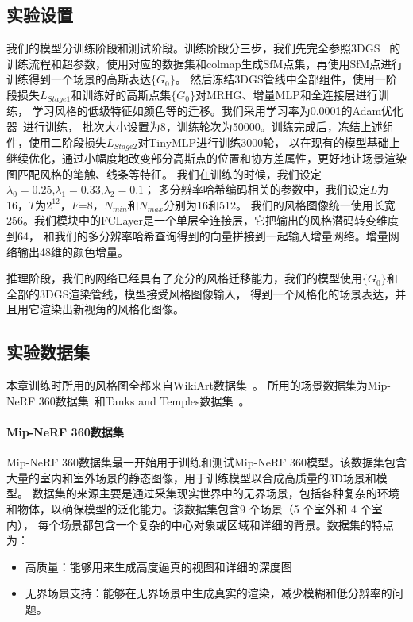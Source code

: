\subsection{实验设置}
我们的模型分训练阶段和测试阶段。训练阶段分三步，我们先完全参照3DGS~\cite{kerbl20233d}
的训练流程和超参数，使用对应的数据集和colmap生成SfM点集，再使用SfM点进行训练得到一个场景的高斯表达$\{G_0\}$。
然后冻结3DGS管线中全部组件，使用一阶段损失$L_{Stage1}$和训练好的高斯点集$\{G_0\}$对MRHG、增量MLP和全连接层进行训练，
学习风格的低级特征如颜色等的迁移。我们采用学习率为0.0001的Adam优化器~\cite{diederik2014adam}进行训练，
批次大小设置为8，训练轮次为50000。训练完成后，冻结上述组件，使用二阶段损失$L_{Stage2}$对TinyMLP进行训练3000轮，
以在现有的模型基础上继续优化，通过小幅度地改变部分高斯点的位置和协方差属性，更好地让场景渲染图匹配风格的笔触、线条等特征。
我们在训练的时候，我们设定\(\lambda_0=0.25\text{,}\lambda_1=0.33\text{,}\lambda_2=0.1\)；
多分辨率哈希编码相关的参数中，我们设定$L$为16，$T$为$2^{12}$，$F$=8，$N_{min}$和$N_{max}$分别为16和512。
我们的风格图像统一使用长宽256。我们模块中的FCLayer是一个单层全连接层，它把输出的风格潜码转变维度到64，
和我们的多分辨率哈希查询得到的向量拼接到一起输入增量网络。增量网络输出48维的颜色增量。
\par 推理阶段，我们的网络已经具有了充分的风格迁移能力，我们的模型使用$\{G_0\}$和全部的3DGS渲染管线，模型接受风格图像输入，
得到一个风格化的场景表达，并且用它渲染出新视角的风格化图像。
\subsection{实验数据集}
本章训练时所用的风格图全都来自WikiArt数据集~\cite{wikiart2018}。
所用的场景数据集为Mip-NeRF 360数据集~\cite{barron2022mip}和Tanks and Temples数据集~\cite{knapitsch2017tanks}。
\paragraph{Mip-NeRF 360数据集}
Mip-NeRF 360数据集最一开始用于训练和测试Mip-NeRF 360模型。该数据集包含大量的室内和室外场景的静态图像，用于训练模型以合成高质量的3D场景和模型。
数据集的来源主要是通过采集现实世界中的无界场景，包括各种复杂的环境和物体，以确保模型的泛化能力‌。该数据集包含9 个场景（5 个室外和 4 个室内），
每个场景都包含一个复杂的中心对象或区域和详细的背景。数据集的特点为：
\begin{itemize}
    \item 高质量：能够用来生成高度逼真的视图和详细的深度图
    \item 无界场景支持‌：能够在无界场景中生成真实的渲染，减少模糊和低分辨率的问题。
\end{itemize}
